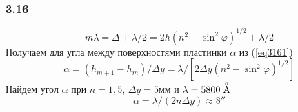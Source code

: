 \subsubsection*{3.16}
\begin{equation}\label{eq3161}
	m \lambda = \Delta + \lambda / 2 = 2h(n^2 - \sin^2 \varphi)^{1/2} + \lambda / 2
\end{equation}
Получаем для угла между поверхностями пластинки $\alpha$ из (\ref{eq3161})
\begin{equation}\label{eq3162}
	\alpha = (h_{m+1} - h_m)/\Delta y = \lambda/\left[ 2 \Delta y (n^2 - \sin^2 \varphi)^{1/2}\right] 
\end{equation}
Найдем угол $\alpha$ при $n=1,5$, $\Delta y = 5мм$ и $\lambda = 5800 \buildrel _\circ \over {\mathrm{A}}$
\begin{equation*}
	\alpha = \lambda / (2n \Delta y) \approx 8''
\end{equation*}